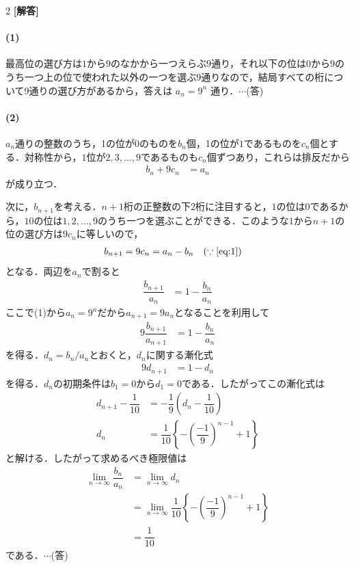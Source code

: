 \documentclass[../../main.tex]{subfiles}
\begin{document}
\setcounter{equation}{0}
\setcounter{figure}{0}
\setcounter{table}{0}
\begin{oframed}
  
\end{oframed}
\setlength{\columnseprule}{0.4pt}
\begin{multicols}{2}
  {\bf [解答]}

  \paragraph{(1)}

  最高位の選び方は$1$から$9$のなかから一つえらぶ$9$通り，それ以下の位は$0$から$9$のうち一つ上の位で使われた以外の一つを選ぶ$9$通りなので，結局すべての桁について$9$通りの選び方があるから，答えは $a_n=9^n$ 通り．$\cdots$(答)

  \paragraph{(2)}
  $a_n$通りの整数のうち，1の位が$0$のものを$b_n$個，1の位が$1$であるものを$c_n$個とする．対称性から，$1$位が$2,3,\dots,9$であるものも$c_n$個ずつあり，これらは排反だから
  \begin{align}\label{eq:1}
    b_n+9c_n & = a_n
  \end{align}
  が成り立つ．

  次に，$b_{n+1}$を考える．$n+1$桁の正整数の下$2$桁に注目すると，$1$の位は$0$であるから，$10$の位は$1,2,\dots,9$のうち一つを選ぶことができる．このような$1$から$n+1$の位の選び方は$9c_n$に等しいので，
  \begin{align}
    b_{n+1} & = 9c_n = a_n-b_n \quad (\because \text{\cref{eq:1}})
  \end{align}
  となる．両辺を$a_n$で割ると
  \begin{align}
    \dfrac{b_{n+1}}{a_n} & = 1-\dfrac{b_n}{a_n}
  \end{align}
  ここで(1)から$a_n=9^n$だから$a_{n+1}=9 a_{n}$となることを利用して
  \begin{align}
    9\dfrac{b_{n+1}}{a_{n+1}} & = 1-\dfrac{b_n}{a_n}
  \end{align}
  を得る．$d_n=b_{n}/a_{n}$とおくと，$d_n$に関する漸化式
  \begin{align}
    9d_{n+1} & = 1-d_n
  \end{align}
  を得る．$d_n$の初期条件は$b_1=0$から$d_1=0$である．したがってこの漸化式は
  \begin{align}
    d_{n+1}-\dfrac{1}{10} & = -\dfrac{1}{9}\left(d_n-\dfrac{1}{10}\right)                      \\
    d_n                  & = \dfrac{1}{10} \left\{-\left(\dfrac{-1}{9}\right)^{n-1}+1\right\}
  \end{align}
  と解ける．したがって求めるべき極限値は
  \begin{align}
    \lim_{n \to \infty} \dfrac{b_n}{a_n} & = \lim_{n \to \infty} d_n                                                           \\
    & = \lim_{n \to \infty} \dfrac{1}{10}\left\{-\left(\dfrac{-1}{9}\right)^{n-1}+1\right\} \\
    & = \dfrac{1}{10}
  \end{align}
  である．$\cdots$(答)


\end{multicols}
\end{document}
